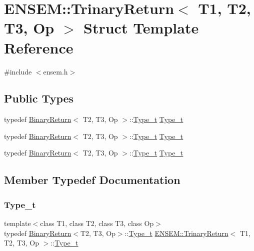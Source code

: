 \hypertarget{structENSEM_1_1TrinaryReturn}{}\section{E\+N\+S\+EM\+:\+:Trinary\+Return$<$ T1, T2, T3, Op $>$ Struct Template Reference}
\label{structENSEM_1_1TrinaryReturn}


{\ttfamily \#include $<$ensem.\+h$>$}

\subsection*{Public Types}
\begin{DoxyCompactItemize}
\item 
typedef \mbox{\hyperlink{structENSEM_1_1BinaryReturn}{Binary\+Return}}$<$ T2, T3, Op $>$\+::\mbox{\hyperlink{structENSEM_1_1TrinaryReturn_a3b5bb49c40f17dcf3bdb007c9e591b0e}{Type\+\_\+t}} \mbox{\hyperlink{structENSEM_1_1TrinaryReturn_a3b5bb49c40f17dcf3bdb007c9e591b0e}{Type\+\_\+t}}
\item 
typedef \mbox{\hyperlink{structENSEM_1_1BinaryReturn}{Binary\+Return}}$<$ T2, T3, Op $>$\+::\mbox{\hyperlink{structENSEM_1_1TrinaryReturn_a3b5bb49c40f17dcf3bdb007c9e591b0e}{Type\+\_\+t}} \mbox{\hyperlink{structENSEM_1_1TrinaryReturn_a3b5bb49c40f17dcf3bdb007c9e591b0e}{Type\+\_\+t}}
\item 
typedef \mbox{\hyperlink{structENSEM_1_1BinaryReturn}{Binary\+Return}}$<$ T2, T3, Op $>$\+::\mbox{\hyperlink{structENSEM_1_1TrinaryReturn_a3b5bb49c40f17dcf3bdb007c9e591b0e}{Type\+\_\+t}} \mbox{\hyperlink{structENSEM_1_1TrinaryReturn_a3b5bb49c40f17dcf3bdb007c9e591b0e}{Type\+\_\+t}}
\end{DoxyCompactItemize}


\subsection{Member Typedef Documentation}
\mbox{\label{structENSEM_1_1TrinaryReturn_a3b5bb49c40f17dcf3bdb007c9e591b0e}} 
\subsubsection{\texorpdfstring{Type\_t}{Type\_t}\hspace{0.1cm}{\footnotesize\ttfamily [1/3]}}
{\footnotesize\ttfamily template$<$class T1, class T2, class T3, class Op$>$ \\
typedef \mbox{\hyperlink{structENSEM_1_1BinaryReturn}{Binary\+Return}}$<$T2, T3, Op$>$\+::\mbox{\hyperlink{structENSEM_1_1TrinaryReturn_a3b5bb49c40f17dcf3bdb007c9e591b0e}{Type\+\_\+t}} \mbox{\hyperlink{structENSEM_1_1TrinaryReturn}{E\+N\+S\+E\+M\+::\+Trinary\+Return}}$<$ T1, T2, T3, Op $>$\+::\mbox{\hyperlink{structENSEM_1_1TrinaryReturn_a3b5bb49c40f17dcf3bdb007c9e591b0e}{Type\+\_\+t}}}

